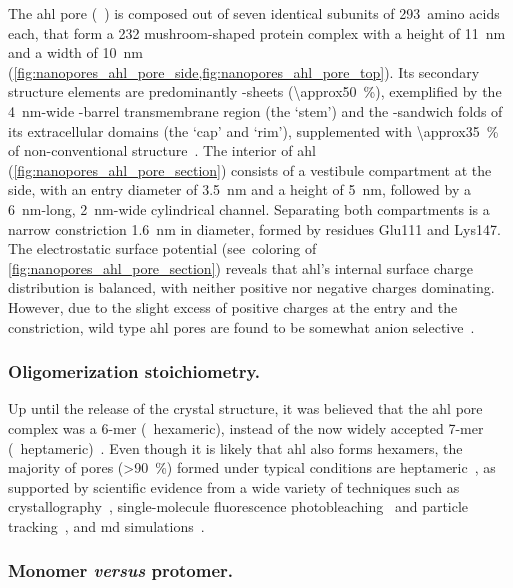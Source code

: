 The \gls{ahl} pore (~\cite{Song-1996}) is composed out of seven identical subunits of 293~amino
acids each, that form a \SI{232}{\kDa} mushroom-shaped protein complex with a height of \SI{11}{\nm} and a
width of \SI{10}{\nm} (\cref{fig:nanopores_ahl_pore_side,fig:nanopores_ahl_pore_top}). Its secondary structure
elements are predominantly \tb-sheets (\SI{\approx50}{\percent}), exemplified by the \SI{4}{\nm}-wide
\tb-barrel transmembrane region (the `stem') and the \tb-sandwich folds of its extracellular domains (the
`cap' and `rim'), supplemented with \SI{\approx35}{\percent} of non-conventional structure~\cite{Song-1996}.
The interior of \gls{ahl} (\cref{fig:nanopores_ahl_pore_section}) consists of a vestibule compartment at the
\cisi{} side, with an entry diameter of \SI{3.5}{\nm} and a height of \SI{5}{\nm}, followed by a
\SI{6}{\nm}-long, \SI{2}{\nm}-wide cylindrical channel. Separating both compartments is a narrow constriction
\SI{1.6}{\nm} in diameter, formed by residues Glu111 and Lys147. The electrostatic surface potential
(see~coloring of \cref{fig:nanopores_ahl_pore_section}) reveals that \gls{ahl}'s internal surface charge
distribution is balanced, with neither positive nor negative charges dominating. However, due to the slight
excess of positive charges at the \cisi{} entry and the constriction, wild type \gls{ahl} pores are found to
be somewhat anion selective~\cite{Menestrina-1986}.


\subsubsection{Oligomerization stoichiometry.}
%

Up until the release of the crystal structure, it was believed that the \gls{ahl} pore complex was a 6-mer
(\ie~hexameric), instead of the now widely accepted 7-mer (\ie~heptameric)~\cite{Song-1996}. Even though it is
likely that \gls{ahl} also forms hexamers, the majority of pores (\SI{>90}{\percent}) formed under typical
conditions are heptameric~\cite{Menestrina-1986}, as supported by scientific evidence from a wide variety of
techniques such as crystallography~\cite{Song-1996,Galdiero-2004}, single-molecule fluorescence
photobleaching~\cite{Das-2007} and particle tracking~\cite{Thompson-2011}, and \gls{md}
simulations~\cite{Aksimentiev-2005,Bhattacharya-2011,Basdevant-2019}. 


\subsubsection{Monomer \textit{versus} protomer.}
%

